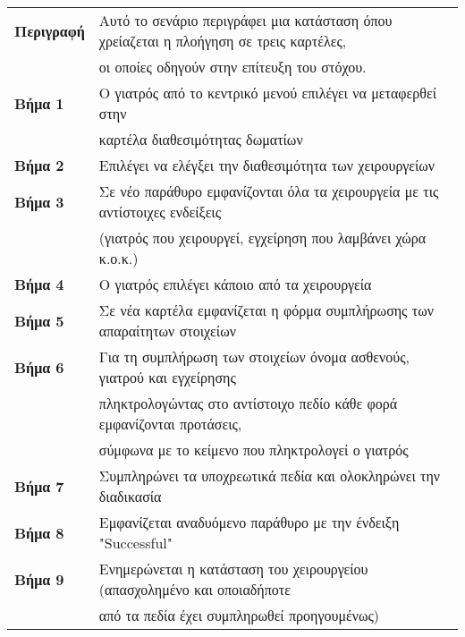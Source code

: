 \documentclass{article}
\newcommand\T{\rule{0pt}{2.6ex}}       %
\newcommand\B{\rule[-1.2ex]{0pt}{0pt}}
\begin{document}
 \begin{center}
     \begin{tabular}{|l|l|}
     \hline
      \textbf{Περιγραφή} & Αυτό το σενάριο περιγράφει μια κατάσταση όπου χρείαζεται η πλοήγηση σε τρεις καρτέλες, \T \\& οι οποίες οδηγούν στην επίτευξη του στόχου. \B \\ 
      \hline
      \textbf{Βήμα 1} & Ο γιατρός από το κεντρικό μενού επιλέγει να μεταφερθεί στην \T \\& καρτέλα διαθεσιμότητας δωματίων \B \\
      \hline
      \textbf{Βήμα 2} & Επιλέγει να ελέγξει την διαθεσιμότητα των χειρουργείων \T\B \\ 
      \hline
      \textbf{Βήμα 3} & Σε νέο παράθυρο εμφανίζονται όλα τα χειρουργεία με τις αντίστοιχες ενδείξεις \T \\& (γιατρός που χειρουργεί, εγχείρηση που λαμβάνει χώρα κ.ο.κ.) \B \\
      \hline
      \textbf{Βήμα 4} & Ο γιατρός επιλέγει κάποιο από τα χειρουργεία \T\B \\
      \hline
      \textbf{Βήμα 5} & Σε νέα καρτέλα εμφανίζεται η φόρμα συμπλήρωσης των απαραίτητων στοιχείων \T\B \\
      \hline
      \textbf{Βήμα 6} & Για τη συμπλήρωση των στοιχείων όνομα ασθενούς, γιατρού και εγχείρησης \T \\& πληκτρολογώντας στο αντίστοιχο πεδίο κάθε φορά εμφανίζονται προτάσεις, \\& σύμφωνα με το κείμενο που πληκτρολογεί ο γιατρός \B \\
      \hline      
      \textbf{Βήμα 7} & Συμπληρώνει τα υποχρεωτικά πεδία και ολοκληρώνει την διαδικασία\T\B \\
      \hline
      \textbf{Βήμα 8} & Εμφανίζεται αναδυόμενο παράθυρο με την ένδειξη "Successful" \T\B \\
      \hline
      \textbf{Βήμα 9} & Eνημερώνεται η κατάσταση του χειρουργείου (απασχολημένο και οποιαδήποτε \T \\& από τα πεδία έχει συμπληρωθεί προηγουμένως) \B \\
      \hline
     \end{tabular}
 \end{center}
 
\end{document}
